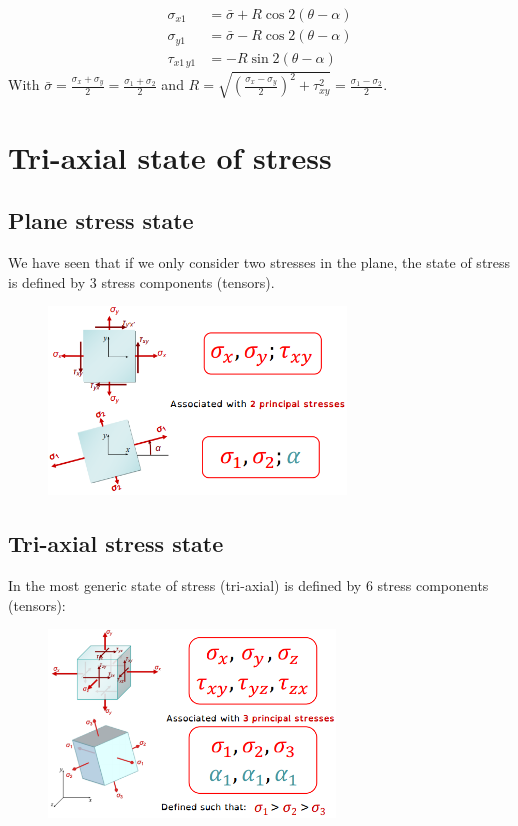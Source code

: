 \documentclass[class=report, crop=false, 12pt,a4paper]{standalone}
\begin{document}
\begin{figure}
\begin{minipage}{0.5\textwidth}
\begin{figure}[H]
        \end{figure}
    \end{minipage}
    \caption{}
\end{figure}
\begin{align}
    \sigma_{x1} &= \bar{\sigma} + R\cos 2(\theta - \alpha)\\
    \sigma_{y1} &= \bar{\sigma} - R\cos 2(\theta - \alpha)\\
    \tau_{x1 \, y1} &= -R \sin 2(\theta - \alpha)
\end{align}
With $\bar{\sigma} = \frac{\sigma_x + \sigma_y}{2} = \frac{\sigma_1 + \sigma_2}{2}$ and $R = \sqrt{\left(\frac{\sigma_x - \sigma_y}{2}\right)^2 + \tau^2_{xy}} = \frac{\sigma_1-\sigma_2}{2}$.
\section{Tri-axial state of stress}
\subsection{Plane stress state}
We have seen that if we only consider two stresses in the plane, the state of stress is defined by 3 stress components (tensors).
\begin{figure}[H]
    \centering
    \includegraphics[height = 5cm]{../img/diagram62.png}
    \caption{}
\end{figure}
\subsection{Tri-axial stress state}
In the most generic state of stress (tri-axial) is defined by 6 stress components (tensors): 
\begin{figure}[H]
    \centering
    \includegraphics[height = 5cm]{../img/diagram63.png}
    \caption{}
\end{figure}
\end{document}
